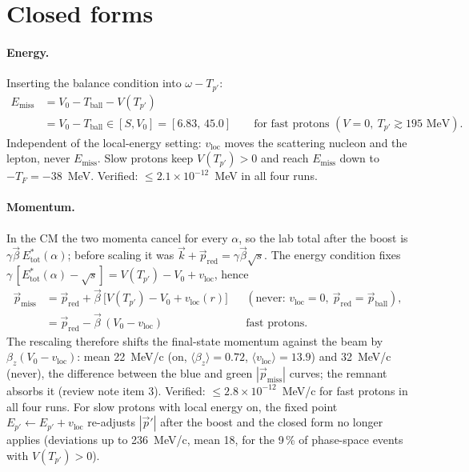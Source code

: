 \documentclass[11pt]{article}
\newcommand{\vv}[1]{\vec{#1}}
\newcommand{\ball}{\mathrm{ball}}
\newcommand{\red}{\mathrm{red}}
\newcommand{\loc}{\mathrm{loc}}
\newcommand{\miss}{\mathrm{miss}}
\newcommand{\TF}{T_F}
\newcommand{\Vz}{V_0}
\begin{document}
\section{Closed forms}

\paragraph{Energy.} Inserting the balance condition into $\omega-T_{p'}$:
\begin{align*}
E_\miss&=\Vz-T_\ball-V(T_{p'})\\
&=\Vz-T_\ball\in[S,\Vz]=[6.83,\,45.0]
\qquad\text{for fast protons } (V=0,\ T_{p'}\gtrsim195\text{ MeV}).
\end{align*}
Independent of the local-energy setting: $v_\loc$ moves the scattering nucleon and
the lepton, never $E_\miss$. Slow protons keep $V(T_{p'})>0$ and reach $E_\miss$ down
to $-\TF=-38$~MeV. Verified: $\le2.1\times10^{-12}$~MeV in all four runs.

\paragraph{Momentum.} In the CM the two momenta cancel for every $\alpha$, so the
lab total after the boost is $\gamma\vv\beta\,E^*_{\mathrm{tot}}(\alpha)$; before
scaling it was $\vv k+\vv p_\red=\gamma\vv\beta\sqrt s$. The energy condition fixes
$\gamma\,[E^*_{\mathrm{tot}}(\alpha)-\sqrt s]=V(T_{p'})-\Vz+v_\loc$, hence
\begin{align*}
\vv p_\miss&=\vv p_\red+\vv\beta\,\big[V(T_{p'})-\Vz+v_\loc(r)\big]
&&(\text{never: } v_\loc=0,\ \vv p_\red=\vv p_\ball),\\
&=\vv p_\red-\vv\beta\,(\Vz-v_\loc) &&\text{fast protons.}
\end{align*}
The rescaling therefore shifts the final-state momentum against the beam by
$\beta_z(\Vz-v_\loc)$: mean 22~MeV/c (on, $\langle\beta_z\rangle=0.72$,
$\langle v_\loc\rangle=13.9$) and 32~MeV/c (never), the difference between the blue
and green $|\vv p_\miss|$ curves; the remnant absorbs it (review note item 3).
Verified: $\le2.8\times10^{-12}$~MeV/c for fast protons in all four runs. For slow
protons with local energy on, the fixed point $E_{p'}\leftarrow E_{p'}+v_\loc$
re-adjusts $|\vv p'|$ after the boost and the closed form no longer applies
(deviations up to 236~MeV/c, mean 18, for the 9\,\% of phase-space events with
$V(T_{p'})>0$).
\end{document}
